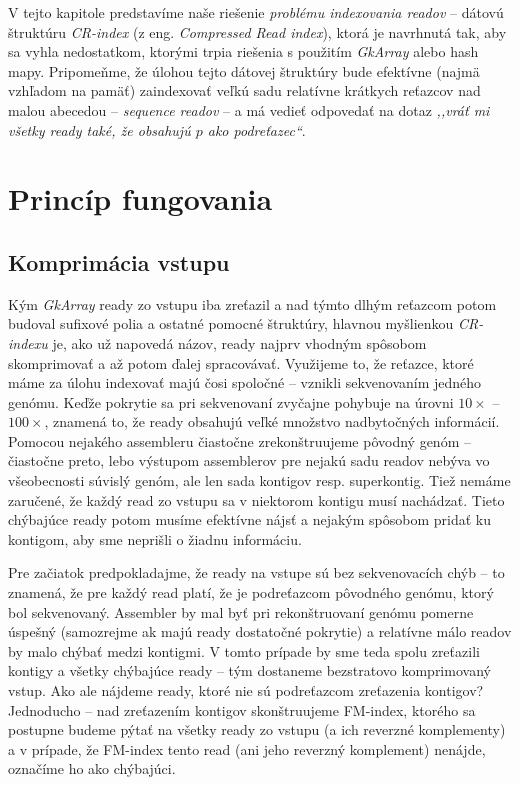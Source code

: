 V tejto kapitole predstavíme naše riešenie \emph{problému indexovania readov} -- dátovú štruktúru \emph{CR-index} (z eng. \emph{Compressed Read index}), ktorá je navrhnutá tak, aby sa vyhla nedostatkom, ktorými trpia riešenia s použitím \emph{GkArray} alebo hash mapy. Pripomeňme, že úlohou tejto dátovej štruktúry bude efektívne (najmä vzhľadom na pamäť) zaindexovať veľkú sadu relatívne krátkych reťazcov nad malou abecedou -- \emph{sequence readov} -- a má vedieť odpovedať na dotaz \emph{,,vráť mi všetky ready také, že obsahujú $p$ ako podreťazec``}.

\section{Princíp fungovania}

\subsection{Komprimácia vstupu}
Kým \emph{GkArray} ready zo vstupu iba zreťazil a nad týmto dlhým reťazcom potom budoval sufixové polia a ostatné pomocné štruktúry, hlavnou myšlienkou \emph{CR-indexu} je, ako už napovedá názov, ready najprv vhodným spôsobom skomprimovať a až potom ďalej spracovávať. Využijeme to, že reťazce, ktoré máme za úlohu indexovať majú čosi spoločné -- vznikli sekvenovaním jedného genómu. Keďže pokrytie sa pri sekvenovaní zvyčajne pohybuje na úrovni $10\times$ -- $100\times$, znamená to, že ready obsahujú veľké množstvo nadbytočných informácií. Pomocou nejakého assembleru čiastočne zrekonštruujeme pôvodný genóm -- čiastočne preto, lebo výstupom assemblerov pre nejakú sadu readov nebýva vo všeobecnosti súvislý genóm, ale len sada kontigov resp. superkontig. Tiež nemáme zaručené, že každý read zo vstupu sa v niektorom kontigu musí nachádzať. Tieto chýbajúce ready potom musíme efektívne nájsť a nejakým spôsobom pridať ku kontigom, aby sme neprišli o žiadnu informáciu.

Pre začiatok predpokladajme, že ready na vstupe sú bez sekvenovacích chýb -- to znamená, že pre každý read platí, že je podreťazcom pôvodného genómu, ktorý bol sekvenovaný. Assembler by mal byť pri rekonštruovaní genómu pomerne úspešný (samozrejme ak majú ready dostatočné pokrytie) a relatívne málo readov by malo chýbať medzi kontigmi. V tomto prípade by sme teda spolu zreťazili kontigy a všetky chýbajúce ready -- tým dostaneme bezstratovo komprimovaný vstup. Ako ale nájdeme ready, ktoré nie sú podreťazcom zreťazenia kontigov? Jednoducho -- nad zreťazením kontigov skonštruujeme FM-index, ktorého sa postupne budeme pýtať na všetky ready zo vstupu (a ich reverzné komplementy) a v prípade, že FM-index tento read (ani jeho reverzný komplement) nenájde, označíme ho ako chýbajúci.

